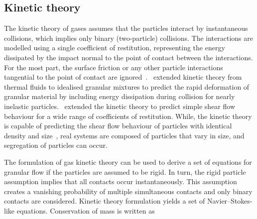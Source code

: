 \subsection{Kinetic theory}
The kinetic theory of gases assumes that the particles interact by 
instantaneous collisions, which implies only binary (two-particle) collisions. 
The interactions are modelled using a single coefficient of restitution, 
representing the energy dissipated by the impact normal to the point of contact 
between the interactions. For the most part, the surface friction or any other 
particle interactions tangential to the point of contact are 
ignored~\citep{Campbell1990}.~\citet{Jenkins1983} extended kinetic theory 
from thermal fluids to idealised granular mixtures to predict the rapid 
deformation of granular material by including energy dissipation during 
collision for nearly inelastic particles.~\citet{Savage1981} extended the 
kinetic theory to predict simple shear flow behaviour for a wide range of 
coefficients of restitution. While, the kinetic theory is capable of predicting 
the shear flow behaviour of particles with identical density and 
size~\citep{Iddir2005}, real systems are composed of particles that vary in 
size, and segregation of particles can occur. 

The formulation of gas kinetic theory can be used to derive a
set of equations for granular flow if the particles are assumed to
be rigid. In turn, the rigid particle assumption implies that all contacts 
occur instantaneously. This assumption creates a vanishing probability of 
multiple simultaneous contacts and only binary contacts are considered. Kinetic 
theory formulation yields a set of Navier–Stokes-like 
equations. 
Conservation of mass is written as

